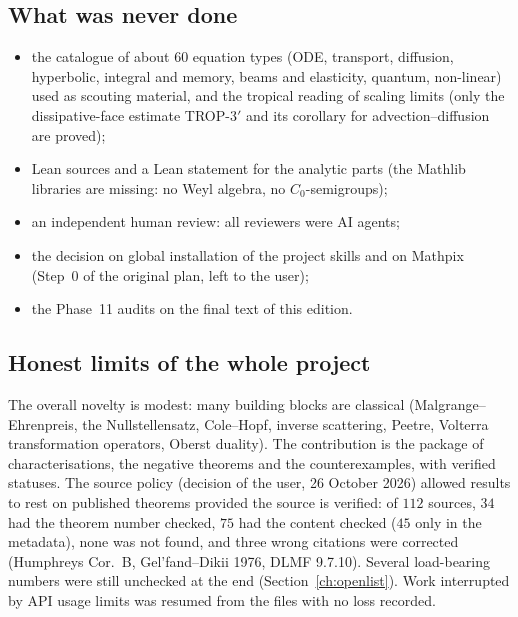 \documentclass[11pt]{article}
\theoremstyle{plain}
\theoremstyle{definition}
\theoremstyle{remark}
\begin{document}
\subsection{What was never done}

\begin{itemize}
\item the catalogue of about $60$ equation types (ODE, transport, diffusion, hyperbolic, integral and memory, beams and elasticity, quantum, non-linear) used as scouting material, and the tropical reading of scaling limits (only the dissipative-face estimate TROP-3$'$ and its corollary for advection--diffusion are proved);
\item Lean sources and a Lean statement for the analytic parts (the Mathlib libraries are missing: no Weyl algebra, no $C_0$-semigroups);
\item an independent human review: all reviewers were AI agents;
\item the decision on global installation of the project skills and on Mathpix (Step~0 of the original plan, left to the user);
\item the Phase~11 audits on the final text of this edition.
\end{itemize}

\subsection{Honest limits of the whole project}

The overall novelty is modest: many building blocks are classical (Malgrange--Ehrenpreis, the Nullstellensatz, Cole--Hopf, inverse scattering, Peetre, Volterra transformation operators, Oberst duality). The contribution is the package of characterisations, the negative theorems and the counterexamples, with verified statuses. The source policy (decision of the user, 26 October 2026) allowed results to rest on published theorems provided the source is verified: of $112$ sources, $34$ had the theorem number checked, $75$ had the content checked ($45$ only in the metadata), none was not found, and three wrong citations were corrected (Humphreys Cor.~B, Gel'fand--Dikii 1976, DLMF 9.7.10). Several load-bearing numbers were still unchecked at the end (Section~\ref{ch:openlist}). Work interrupted by API usage limits was resumed from the files with no loss recorded.



\appendix

\end{document}
